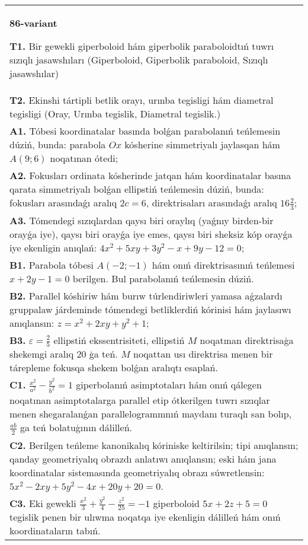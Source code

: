 \documentclass{article}
\begin{document}
\begin{tabular}{m{17cm}}
\textbf{86-variant}
\newline

\textbf{T1.} Bir gewekli giperboloid hám giperbolik paraboloidtıń tuwrı sızıqlı jasawshıları (Giperboloid, Giperbolik paraboloid, Sızıqlı jasawshılar) \\
\textbf{T2.} Ekinshi tártipli betlik orayı, urınba tegisligi hám diametral tegisligi (Oray, Urınba tegislik, Diametral tegislik.) \\
\textbf{A1.} Tóbesi koordinatalar basında bolǵan parabolanıń teńlemesin dúziń, bunda: parabola $Ox$ kósherine simmetriyalı jaylasqan hám $A (9; 6) $ noqatınan ótedi; \\
\textbf{A2.} Fokusları ordinata kósherinde jatqan hám koordinatalar basına qarata simmetriyalı bolǵan ellipstiń teńlemesin dúziń, bunda: fokusları arasındaǵı aralıq $2 c=6$, direktrisaları arasındaǵı aralıq $16 \frac{2}{3}$; \\
\textbf{A3.} Tómendegi sızıqlardan qaysı biri oraylıq (yaǵnıy birden-bir orayǵa iye), qaysı biri orayǵa iye emes, qaysı biri sheksiz kóp orayǵa iye ekenligin anıqlań: $4 x^2+5 x y+3 y^2-x+9 y-12=0$; \\
\textbf{B1.} Parabola tóbesi $A (-2;-1) $ hám onıń direktrisasınıń teńlemesi $x+2y-1=0$ berilgen. Bul parabolanıń teńlemesin dúziń. \\
\textbf{B2.} Parallel kóshiriw hám burıw túrlendiriwleri yamasa aǵzalardı gruppalaw járdeminde tómendegi betliklerdiń kórinisi hám jaylasıwı anıqlansın: $z=x^2+2 x y+y^2+1$; \\
\textbf{B3.} $\varepsilon=\frac{2}{5}$ ellipstiń ekssentrisiteti, ellipstiń $M$ noqatınan direktrisaģa shekemgi aralıq 20 ģa teń. $M$ noqattan usı direktrisa menen bir tárepleme fokusqa shekem bolǵan aralıqtı esaplań. \\
\textbf{C1.} $\frac{x^2}{a^2}-\frac{y^2}{b^2}=1$ giperbolanıń asimptotaları hám onıń qálegen noqatınan asimptotalarga parallel etip ótkerilgen tuwrı sızıqlar menen shegaralanǵan parallelogrammnıń maydanı turaqlı san bolıp, $\frac{a b}{2}$ ga teń bolatuģının dálilleń. \\
\textbf{C2.} Berilgen teńleme kanonikalıq kóriniske keltirilsin; tipi anıqlansın; qanday geometriyalıq obrazdı anlatıwı anıqlansın; eski hám jana koordinatalar sistemasında geometriyalıq obrazı súwretlensin: $5 x^2-2 x y+5 y^2-4 x+20 y+20=0$. \\
\textbf{C3.} Eki gewekli $\frac{x^2}{3}+\frac{y^2}{4}-\frac{z^2}{25}=-1$ giperboloid $5 x+2 z+5=0$ tegislik penen bir ulıwma noqatqa iye ekenligin dálilleń hám onıń koordinataların tabıń. \\

\end{tabular}
\vspace{1cm}
\end{document}
